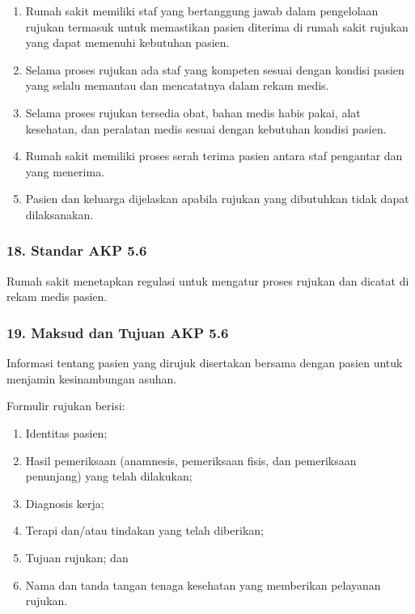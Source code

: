 \documentclass[
]{book}
\providecommand{\tightlist}{%
  \setlength{\itemsep}{0pt}\setlength{\parskip}{0pt}}
\begin{document}
\begin{enumerate}
\def\labelenumi{\alph{enumi}.}
\tightlist
\item
  Rumah sakit memiliki staf yang bertanggung jawab dalam pengelolaan rujukan termasuk untuk memastikan pasien diterima di rumah sakit rujukan yang dapat memenuhi kebutuhan pasien.
\item
  Selama proses rujukan ada staf yang kompeten sesuai dengan kondisi pasien yang selalu memantau dan mencatatnya dalam rekam medis.
\item
  Selama proses rujukan tersedia obat, bahan medis habis pakai, alat kesehatan, dan peralatan medis sesuai dengan kebutuhan kondisi pasien.
\item
  Rumah sakit memiliki proses serah terima pasien antara staf pengantar dan yang menerima.
\item
  Pasien dan keluarga dijelaskan apabila rujukan yang dibutuhkan tidak dapat dilaksanakan.
\end{enumerate}

\hypertarget{standar-akp-5.6}{%
\subsubsection*{18. Standar AKP 5.6}\label{standar-akp-5.6}}

Rumah sakit menetapkan regulasi untuk mengatur proses rujukan dan dicatat di rekam medis pasien.

\hypertarget{maksud-dan-tujuan-akp-5.6}{%
\subsubsection*{19. Maksud dan Tujuan AKP 5.6}\label{maksud-dan-tujuan-akp-5.6}}

Informasi tentang pasien yang dirujuk disertakan bersama dengan pasien untuk menjamin kesinambungan asuhan.

Formulir rujukan berisi:

\begin{enumerate}
\def\labelenumi{\alph{enumi}.}
\tightlist
\item
  Identitas pasien;
\item
  Hasil pemeriksaan (anamnesis, pemeriksaan fisis, dan pemeriksaan penunjang) yang telah dilakukan;
\item
  Diagnosis kerja;
\item
  Terapi dan/atau tindakan yang telah diberikan;
\item
  Tujuan rujukan; dan
\item
  Nama dan tanda tangan tenaga kesehatan yang memberikan pelayanan rujukan.
\end{enumerate}
\end{document}
